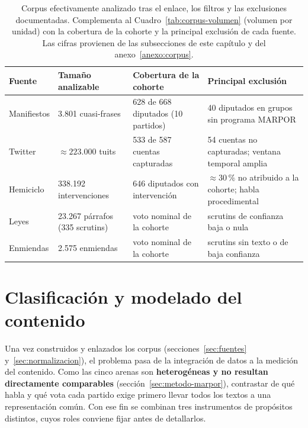 \begin{table}[H]
\centering
\caption{Corpus efectivamente analizado tras el enlace, los filtros y las
exclusiones documentadas. Complementa al Cuadro~\ref{tab:corpus-volumen}
(volumen por unidad) con la cobertura de la cohorte y la principal exclusión de
cada fuente. Las cifras provienen de las subsecciones de este capítulo y del
anexo~\ref{anexo:corpus}.}
\label{tab:corpus-final}
\footnotesize
\setlength{\tabcolsep}{4pt}
\renewcommand{\arraystretch}{1.15}
\begin{tabularx}{\textwidth}{@{}l l Y Y@{}}
\toprule
\textbf{Fuente} & \textbf{Tamaño analizable} & \textbf{Cobertura de la cohorte} & \textbf{Principal exclusión} \\
\midrule
Manifiestos & 3.801 cuasi-frases & 628 de 668 diputados (10 partidos) & 40 diputados en grupos sin programa MARPOR \\
Twitter & $\approx 223.000$ tuits & 533 de 587 cuentas capturadas & 54 cuentas no capturadas; ventana temporal amplia \\
Hemiciclo & 338.192 intervenciones & 646 diputados con intervención & $\approx 30\,\%$ no atribuido a la cohorte; habla procedimental \\
Leyes & 23.267 párrafos (335 scrutins) & voto nominal de la cohorte & scrutins de confianza baja o nula \\
Enmiendas & 2.575 enmiendas & voto nominal de la cohorte & scrutins sin texto o de baja confianza \\
\bottomrule
\end{tabularx}
\end{table}

\section{Clasificación y modelado del contenido}
\label{sec:clasificacion}

Una vez construidos y enlazados los corpus (secciones~\ref{sec:fuentes}
y~\ref{sec:normalizacion}), el problema pasa de la integración de datos a la
medición del contenido. Como las cinco arenas son \textbf{heterogéneas y no
resultan directamente comparables} (sección~\ref{sec:metodo-marpor}), contrastar
de qué habla y qué vota cada partido exige primero llevar todos los textos a una
representación común. Con ese fin se combinan tres instrumentos de propósitos
distintos, cuyos roles conviene fijar antes de detallarlos.


